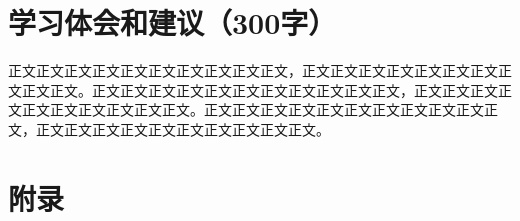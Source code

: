 \documentclass{article}
\begin{document}
\section{学习体会和建议（300字）}
正文正文正文正文正文正文正文正文正文正文，正文正文正文正文正文正文正文正文正文正文。正文正文正文正文正文正文正文正文正文正文正文，正文正文正文正文正文正文正文正文正文正文。正文正文正文正文正文正文正文正文正文正文正文，正文正文正文正文正文正文正文正文正文正文。


\newpage{}
\appendix
\section{附录}
\end{document}
